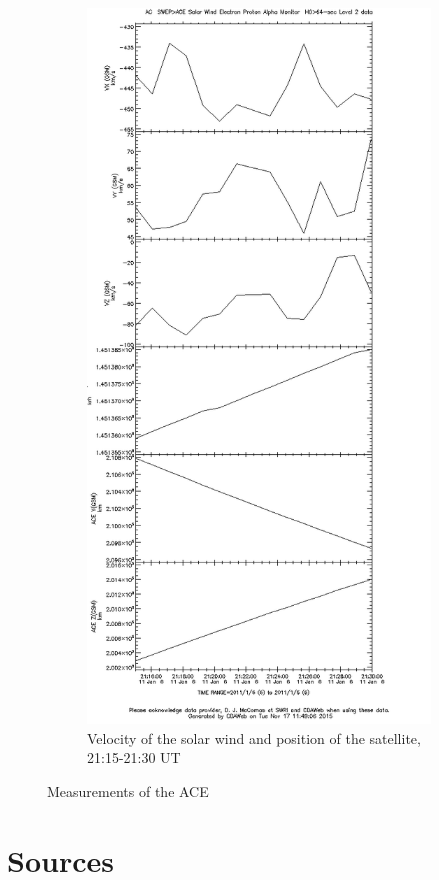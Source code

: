 \documentclass[10pt,a4paper]{article}
\begin{document}
\begin{figure}[h]
\begin{subfigure}[h]{.5\textwidth}
		\includegraphics[width=.8\linewidth]{ace-2115-2130-v-s.png}
		\caption{Velocity of the solar wind and position of the satellite, 21:15-21:30 UT}
		\label{ace4}
	\end{subfigure}
	\caption{Measurements of the ACE}
	\label{ace}
\end{figure}







\section{Sources}
\end{document}
